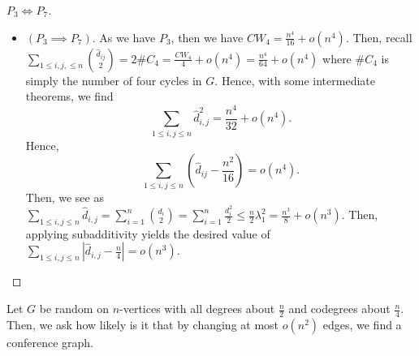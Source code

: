 \begin{proof}[\(P_3 \iff P_7\)]
	\begin{itemize}
		\item \(\left( P_3 \implies P_7 \right) \). As we have \(P_3\), then we have \(CW_4 = \frac{n^{4}}{16} + o(n^{4})\). Then, recall \(\sum_{1 \le i, j, \le n}^{} \binom{\hat{d}_{ij}}{2} = 2\#C_4 = \frac{CW_4}{4} + o\left( n^{4} \right) = \frac{n^{4}}{64} + o(n^{4})\) where \(\#C_4\) is simply the number of four cycles in \(G\). Hence, with some intermediate theorems, we find \[
			\sum_{1\le i, j \le n}^{} \hat{d}_{i, j}^2= \frac{n^{4}}{32} + o\left( n^{4} \right) 		.\]
	Hence, \[
		\sum_{1 \le i, j \le n}^{} \left( \hat{d}_{ij} - \frac{n^2}{16} \right) = o\left( n^{4} \right)
	.\] Then, we see as \(\sum_{1 \le i, j \le n}^{}\hat{d}_{i, j} =  \sum_{i= 1}^{n} \binom{d_{i}}{2} = \sum_{i= 1}^{n} \frac{d_{i}^2}{2} \le \frac{n}{2} \lambda_1^2 = \frac{n^3}{8} + o\left( n^3 \right) \). Then, applying subadditivity yields the desired value of \(\sum_{1\le i, j \le n}^{} \left| \hat{d}_{i, j} - \frac{n}{4} \right| = o\left( n^3 \right) \).
	\end{itemize}
\end{proof}
\begin{proposition}
	Let \(G\) be random on \(n\)-vertices with all degrees about \(\frac{n}{2}\) and codegrees about \(\frac{n}{4}\). Then, we ask how likely is it that by changing at most \(o\left( n^2 \right) \) edges, we find a conference graph.
\end{proposition}
